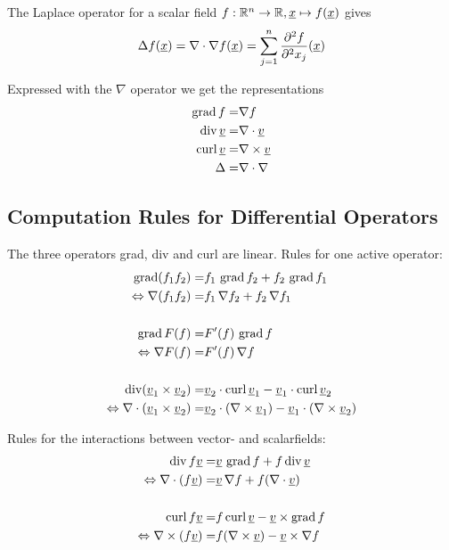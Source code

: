 The Laplace operator for a scalar field $f : \mathbb{R}^n \to \mathbb{R}, \underline{x} \mapsto f(\underline{x})$ gives
\[
	\Delta f(\underline{x})  = \nabla \cdot \nabla f(\underline{x}) = \sum_{j=1}^n \frac{\partial^2 f}{\partial^2 x_j}(\underline{x})
\]


Expressed with the $\nabla$ operator we get the representations
\[
 \begin{aligned}
	\operatorname*{grad} f = & \nabla f \\
	\operatorname*{div} \underline{v} = & \nabla \cdot \underline{v}\\
	\operatorname*{curl} \underline{v} = &  \nabla \times \underline{v} \\
	\Delta = & \nabla \cdot \nabla \\
\end{aligned}
\]

\subsection*{Computation Rules for Differential Operators}
The three operators grad, div and curl are linear. 
Rules for one active operator:
\[
\begin{aligned}
	\operatorname*{grad} (f_1 f_2) =& f_1 \, \operatorname*{grad} f_2 + f_2 \, \operatorname*{grad} f_1\\
	\Leftrightarrow \nabla (f_1 f_2) = & f_1 \, \nabla  f_2 + f_2 \, \nabla f_1\\
	\\
	\operatorname*{grad} F(f) =& F'(f) \, \operatorname*{grad} f \\
	\Leftrightarrow \nabla F(f) = & F'(f) \, \nabla f \\
	\\
	\operatorname*{div} (\underline{v}_1 \times \underline{v}_2) =& \underline{v}_2 \cdot \operatorname*{curl} \underline{v}_1 - \underline{v}_1 \cdot \operatorname*{curl} \underline{v}_2 \\
	\Leftrightarrow \nabla \cdot (\underline{v}_1 \times \underline{v}_2) = &  \underline{v}_2 \cdot (\nabla \times \underline{v}_1) - \underline{v}_1 \cdot (\nabla \times \underline{v}_2) \\
\end{aligned}
\]

Rules for the interactions between vector- and scalarfields:
\[
\begin{aligned}
	\operatorname*{div} f \underline{v} = &  \underline{v} \, \operatorname*{grad} f + f \operatorname*{div} \underline{v}\\
	\Leftrightarrow \nabla \cdot (f\underline{v}) = &  \underline{v} \, \nabla f + f (\nabla \cdot \underline{v})\\
	\\
	\operatorname*{curl} f \underline{v} = &  f \operatorname*{curl} \underline{v}  -  \underline{v} \times \operatorname*{grad} f\\
	\Leftrightarrow \nabla \times (f \underline{v}) = &  f (\nabla \times\underline{v})  -  \underline{v} \times \nabla f\\
\end{aligned}
\]


